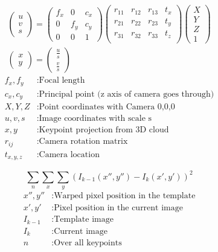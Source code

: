 \documentclass[11pt,a4paper,titlepage,oneside]{report}
\begin{document}
\begin{equation}\label{eq:camera_model}
  \begin{gathered}
    \begin{pmatrix}
      u\\
      v\\
      s
    \end{pmatrix}=
    \begin{pmatrix}
      f_x & 0 & c_x \\
      0 & f_y & c_y \\
      0 & 0 & 1
    \end{pmatrix}
    \begin{pmatrix}
      r_{11} & r_{12} & r_{13} & t_x\\
      r_{21} & r_{22} & r_{23} & t_y\\
      r_{31} & r_{32} & r_{33} & t_z\\
    \end{pmatrix}
    \begin{pmatrix}
      X\\
      Y\\
      Z\\
      1
    \end{pmatrix}\\
    \begin{pmatrix}
      x\\
      y
    \end{pmatrix}=
    \begin{pmatrix}
      \frac{u}{s}\\
      \frac{v}{s}
    \end{pmatrix}
  \end{gathered}
\end{equation}
\begin{align*}
  f_x,f_y  &:  \text{Focal length}\\
  c_x,c_y  &:  \text{Principal point (z axis of camera goes through)}\\
  X,Y,Z     &: \text{Point coordinates with Camera 0,0,0}\\
  u,v,s     &: \text{Image coordinates with scale s}\\
  x,y       &: \text{Keypoint projection from 3D cloud}\\
  r_{ij}    &: \text{Camera rotation matrix}\\
  t_{x,y,z} &: \text{Camera location}
\end{align*}

\begin{equation}\label{eq:intensity}
  \sum_n\sum_x\sum_y(I_{k-1}(x'',y'')-I_{k}(x',y'))^2
\end{equation}
\begin{align*}
  x'',y''        &: \text{Warped pixel position in the template}\\
  x',y'          &: \text{Pixel position in the current image}\\
  I_{k-1}        &: \text{Template image}\\
  I_{k}          &: \text{Current image}\\
  n              &: \text{Over all keypoints}  
\end{align*}
\end{document}
